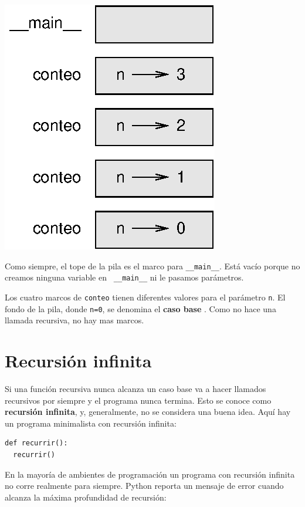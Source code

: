 \beforefig
\centerline{\includegraphics{illustrations/stack2.eps}}
\afterfig

Como siempre, el tope de la pila es el marco para \texttt{\_\_main\_\_}.
Está vacío porque no creamos ninguna variable en {\tt
\_\_main\_\_} ni le pasamos parámetros.

Los cuatro marcos de \texttt{conteo} tienen diferentes valores para
el parámetro \texttt{n}. El fondo de la pila, donde  \texttt{n=0}, se denomina
el {\bf caso base }.  Como no hace una llamada recursiva, no hay mas
marcos.





\section{Recursión infinita}

Si una función recursiva nunca alcanza un caso base va a hacer llamados recursivos por
siempre y el programa nunca termina. Esto se conoce como {\bf recursión infinita}, y, 
generalmente, no se considera una buena idea. Aquí hay un programa minimalista
con recursión infinita:

\beforeverb
\begin{verbatim}
def recurrir():
  recurrir()
\end{verbatim}
\afterverb
%
En la mayoría de ambientes de programación un programa con recursión 
infinita no corre realmente para siempre. Python reporta un mensaje de error
cuando alcanza la máxima profundidad de recursión:

